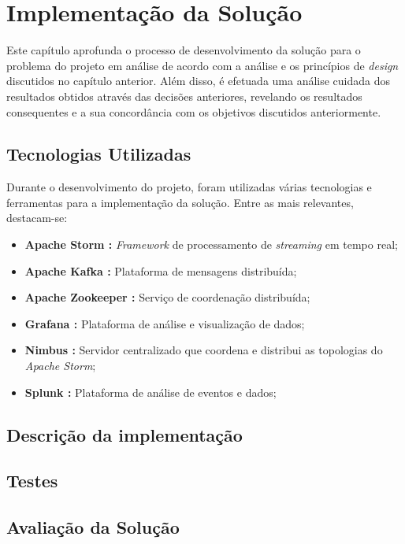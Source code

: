 \chapter{Implementação da Solução}
\label{sec:4-Implementacao}

Este capítulo aprofunda o processo de desenvolvimento da solução para o problema do projeto em 
análise de acordo com a análise e os princípios de \textit{design} discutidos no capítulo anterior. 
Além disso, é efetuada uma análise cuidada dos resultados obtidos através das decisões anteriores, 
revelando os resultados consequentes e a sua concordância com os objetivos discutidos anteriormente.

\section{Tecnologias Utilizadas}

Durante o desenvolvimento do projeto, foram utilizadas várias tecnologias e ferramentas para a 
implementação da solução. Entre as mais relevantes, destacam-se:

\begin{itemize}
  \item \textbf{Apache Storm \cite{storm}:} \textit{Framework} de processamento de 
    \textit{streaming} em tempo real;
  \item \textbf{Apache Kafka \cite{kafka}:} Plataforma de mensagens distribuída;
  \item \textbf{Apache Zookeeper \cite{zookeeper}:} Serviço de coordenação distribuída;
  \item \textbf{Grafana \cite{grafana}:} Plataforma de análise e visualização de dados;
  \item \textbf{Nimbus \cite{nimbus}:} Servidor centralizado que coordena e distribui as topologias 
    do \textit{Apache Storm};
  \item \textbf{Splunk \cite{splunk}:} Plataforma de análise de eventos e dados;
\end{itemize}

\section{Descrição da implementação}




\section{Testes}


\section{Avaliação da Solução}


